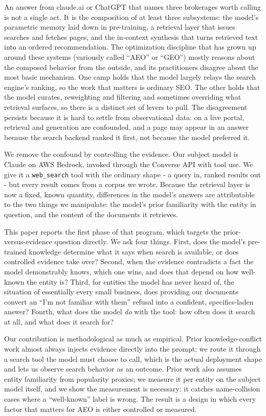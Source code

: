 \documentclass[11pt]{article}
\begin{document}
An answer from claude.ai or ChatGPT that names three brokerages worth calling is not a single
act. It is the composition of at least three subsystems: the model's parametric memory laid down
in pre-training, a retrieval layer that issues searches and fetches pages, and the in-context
synthesis that turns retrieved text into an ordered recommendation. The optimization discipline
that has grown up around these systems (variously called ``AEO'' or ``GEO'') mostly reasons about the
composed behavior from the outside, and its practitioners disagree about the most basic mechanism.
One camp holds that the model largely relays the search engine's ranking, so the work that matters
is ordinary SEO. The other holds that the model curates, reweighting and filtering and sometimes
overriding what retrieval surfaces, so there is a distinct set of levers to pull. The disagreement
persists because it is hard to settle from observational data: on a live portal, retrieval and
generation are confounded, and a page may appear in an answer because the search backend ranked it
first, not because the model preferred it.

We remove the confound by controlling the evidence. Our subject model is Claude on AWS Bedrock,
invoked through the Converse API with tool use. We give it a \texttt{web\_search} tool with the
ordinary shape - a query in, ranked results out - but every result comes from a corpus we wrote.
Because the retrieval layer is now a fixed, known quantity, differences in the model's answers are
attributable to the two things we manipulate: the model's prior familiarity with the entity in
question, and the content of the documents it retrieves.

This paper reports the first phase of that program, which targets the prior-versus-evidence
question directly. We ask four things. First, does the model's pre-trained knowledge determine what
it says when search is available, or does controlled evidence take over? Second, when the evidence
contradicts a fact the model demonstrably knows, which one wins, and does that depend on how
well-known the entity is? Third, for entities the model has never heard of, the situation of
essentially every small business, does providing our documents convert an ``I'm not familiar with
them'' refusal into a confident, specifics-laden answer? Fourth, what does the model \emph{do} with
the tool: how often does it search at all, and what does it search for?

Our contribution is methodological as much as empirical. Prior knowledge-conflict work almost
always injects evidence directly into the prompt; we route it through a search tool the model must
choose to call, which is the actual deployment shape and lets us observe search behavior as an
outcome. Prior work also assumes entity familiarity from popularity proxies; we measure it per
entity on the subject model itself, and we show the measurement is necessary: it catches
name-collision cases where a ``well-known'' label is wrong. The result is a design in which every
factor that matters for AEO is either controlled or measured.
\end{document}
